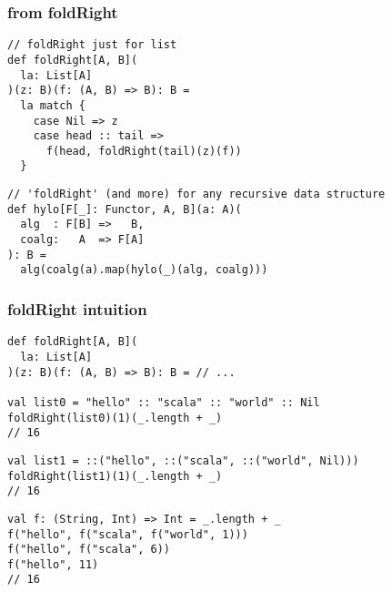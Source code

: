 \documentclass[include/preamble.tex]{subfiles}
\begin{document}
\begin{frame}[fragile]
  \frametitle{from foldRight }
  \begin{center}
    \begin{lstlisting}[style=scala]
// foldRight just for list
def foldRight[A, B](
  la: List[A]
)(z: B)(f: (A, B) => B): B =
  la match {
    case Nil => z
    case head :: tail =>
      f(head, foldRight(tail)(z)(f))
  }
    \end{lstlisting}
    \pause
    \begin{lstlisting}[style=scala]
// 'foldRight' (and more) for any recursive data structure
def hylo[F[_]: Functor, A, B](a: A)(
  alg  : F[B] =>   B,
  coalg:   A  => F[A]
): B =
  alg(coalg(a).map(hylo(_)(alg, coalg)))
    \end{lstlisting}
  \end{center}
\end{frame}

\begin{frame}[fragile]
  \frametitle{foldRight intuition}
  \begin{center}
    \begin{lstlisting}[style=scala]
def foldRight[A, B](
  la: List[A]
)(z: B)(f: (A, B) => B): B = // ...

val list0 = "hello" :: "scala" :: "world" :: Nil
foldRight(list0)(1)(_.length + _)
// 16
    \end{lstlisting}
    \pause
    \begin{lstlisting}[style=scala]
val list1 = ::("hello", ::("scala", ::("world", Nil)))
foldRight(list1)(1)(_.length + _)
// 16
    \end{lstlisting}
    \pause
    \begin{lstlisting}[style=scala]
val f: (String, Int) => Int = _.length + _
f("hello", f("scala", f("world", 1)))
f("hello", f("scala", 6))
f("hello", 11)
// 16
    \end{lstlisting}
  \end{center}
\end{frame}
\end{document}
